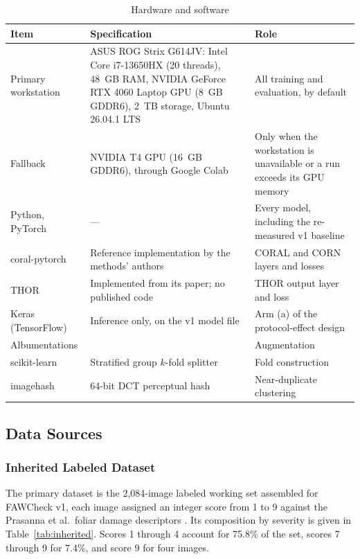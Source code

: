 \documentclass{icsthesis}
\begin{document}
\begin{mainmatter}
				\begin{table}[htbp]
				\vspace{4ex}
				\centering
					\caption{Hardware and software}
					\label{tab:materials}
					\singlespacing\footnotesize
					\begin{tabular}{p{3.0cm}p{6.4cm}p{4.4cm}}
					\hline
					\hline
					Item & Specification & Role \\ \hline
					Primary workstation & ASUS ROG Strix G614JV: Intel Core i7-13650HX (20 threads), 48~GB RAM,
					NVIDIA GeForce RTX 4060 Laptop GPU (8~GB GDDR6), 2~TB storage, Ubuntu 26.04.1 LTS & All
					training and evaluation, by default \\
					Fallback & NVIDIA T4 GPU (16~GB GDDR6), through Google Colab & Only when the workstation is
					unavailable or a run exceeds its GPU memory \\ \hline
					Python, PyTorch & --- & Every model, including the re-measured v1 baseline \\
					coral-pytorch & Reference implementation by the methods' authors \citep{raschka2022coral} &
					CORAL and CORN layers and losses \\
					THOR & Implemented from its paper; no published code \citep{fuchs2022} & THOR output layer and
					loss \\
					Keras (TensorFlow) & Inference only, on the v1 model file & Arm (a) of the protocol-effect design \\
					Albumentations & \citet{buslaev2020} & Augmentation \\
					scikit-learn & Stratified group $k$-fold splitter & Fold construction \\
					imagehash & 64-bit DCT perceptual hash & Near-duplicate clustering \\ \hline\hline
					\end{tabular}
				\vspace{4ex}
				\end{table}

			\subsection{Data Sources}\label{sec:data}

				\subsubsection{Inherited Labeled Dataset}\label{sec:inherited}

					The primary dataset is the 2,084-image labeled working set assembled for
					FAWCheck v1, each image assigned an integer score from 1 to 9 against the
					Prasanna et al.\ foliar damage descriptors \citep{casasola2026,prasanna2018}.
					Its composition by severity is given in Table~\ref{tab:inherited}. Scores 1
					through 4 account for 75.8\% of the set, scores 7 through 9 for 7.4\%, and score
					9 for four images.


\end{mainmatter}
\end{document}

